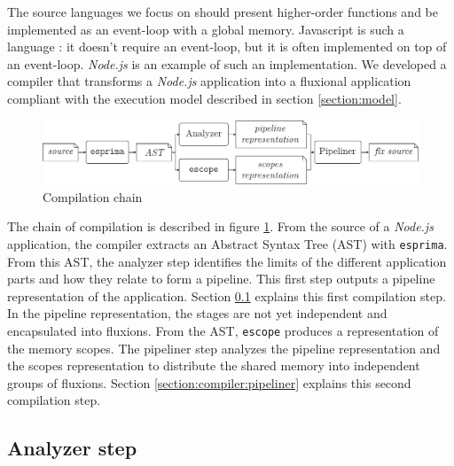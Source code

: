 The source languages we focus on should present higher-order functions and be implemented as an event-loop with a global memory.
Javascript is such a language : it doesn't require an event-loop, but it is often implemented on top of an event-loop.
\textit{Node.js} is an example of such an implementation.
We developed a compiler that transforms a \textit{Node.js} application into a fluxional application compliant with the execution model described in section \ref{section:model}.

\begin{figure}[h!]
\begin{center}
  \includegraphics[width=\linewidth]{ressources/compiler-stream.pdf}
  \caption{Compilation chain}
  \label{fig:compilation}
\end{center}
\end{figure}

The chain of compilation is described in figure \ref{fig:compilation}.
From the source of a \textit{Node.js} application, the compiler extracts an Abstract Syntax Tree (AST) with \texttt{esprima}.
From this AST, the analyzer step identifies the limits of the different application parts and how they relate to form a pipeline.
This first step outputs a pipeline representation of the application.
Section \ref{section:compiler:analyzer} explains this first compilation step.
In the pipeline representation, the stages are not yet independent and encapsulated into fluxions.
From the AST, \texttt{escope} produces a representation of the memory scopes.
The pipeliner step analyzes the pipeline representation and the scopes representation to distribute the shared memory into independent groups of fluxions.
Section \ref{section:compiler:pipeliner} explains this second compilation step.


\subsection{Analyzer step} \label{section:compiler:analyzer}

